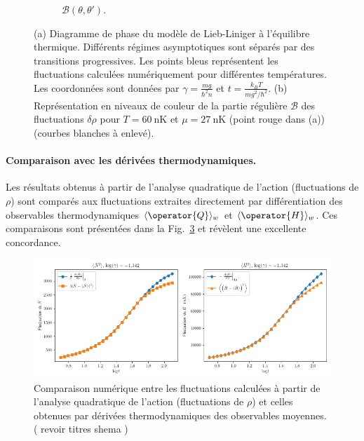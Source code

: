 \begin{figure}[H]
\begin{subfigure}[b]{0.45\textwidth}
		\caption{ \( \mathcal{B}(\theta, \theta') \).}
		\label{fig.fluctu.A}
	\end{subfigure}
	\caption{(a) Diagramme de phase du modèle de Lieb-Liniger à l’équilibre thermique. Différents régimes asymptotiques sont séparés par des transitions progressives. Les points bleus représentent les fluctuations calculées numériquement pour différentes températures. Les coordonnées sont données par \( \gamma = \frac{m g}{\hbar^2 n} \) et \( t = \frac{k_B T}{m g^2/\hbar^2} \). (b) Représentation en niveaux de couleur de la partie régulière $\mathcal{B}$ des fluctuations \( \delta \rho \) pour \( T = 60~\mathrm{nK} \) et \( \mu = 27~\mathrm{nK} \) (point rouge dans (a)){\color{red} (courbes blanches à enlevé)}.}
	\label{fig:diag_fig}
\end{figure}

\paragraph{Comparaison avec les dérivées thermodynamiques.}

Les résultats obtenus à partir de l’analyse quadratique de l’action (fluctuations de \( \rho \)) sont comparés aux fluctuations extraites directement par différentiation des observables thermodynamiques \( \langle \operator{Q} \rangle_w \) et \( \langle \operator{H} \rangle_w \). Ces comparaisons sont présentées dans la Fig.~\ref{fig.fluctu.A_com} et révèlent une excellente concordance.


\begin{figure}[H]
	\centering
	\includegraphics[width=1\textwidth]{figures/04_GGE_Fluctuation/fluctuations_plot_log_gamma=-1.342.png}	
	\caption{Comparaison numérique entre les fluctuations calculées à partir de l’analyse quadratique de l’action (fluctuations de \( \rho \)) et celles obtenues par dérivées thermodynamiques des observables moyennes.{\color{red} ( revoir titres shema )} }
	\label{fig.fluctu.A_com}
\end{figure}



